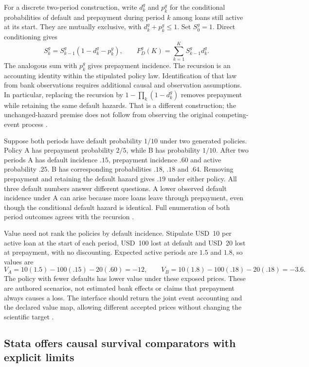 For a discrete two-period construction, write $d_k^g$ and $p_k^g$ for the
conditional probabilities of default and prepayment during period $k$ among
loans still active at its start. They are mutually exclusive, with
$d_k^g+p_k^g\leq1$. Set $S_0^g=1$. Direct conditioning gives
\[
 S_k^g=S_{k-1}^g(1-d_k^g-p_k^g),\qquad
 F_D^g(K)=\sum_{k=1}^K S_{k-1}^g d_k^g.
\]
The analogous sum with $p_k^g$ gives prepayment incidence. The recursion is
an accounting identity within the stipulated policy law. Identification of
that law from bank observations requires additional causal and observation
assumptions. In particular, replacing the recursion by
$1-\prod_k(1-d_k^g)$ removes prepayment while retaining the same default
hazards. That is a different construction; the unchanged-hazard premise
does not follow from observing the original competing-event process
\citep{exec14_survival_exact}.

Suppose both periods have default probability $1/10$ under two generated
policies. Policy A has prepayment probability $2/5$, while B has probability
$1/10$. After two periods A has default incidence $.15$, prepayment incidence
$.60$ and active probability $.25$. B has corresponding probabilities $.18$,
$.18$ and $.64$. Removing prepayment and retaining the default hazard gives
$.19$ under either policy. All three default numbers answer different
questions. A lower observed default incidence under A can arise because more
loans leave through prepayment, even though the conditional default hazard
is identical. Full enumeration of both period outcomes agrees with the
recursion \citep{exec14_survival_exact}.

Value need not rank the policies by default incidence. Stipulate USD~10 per
active loan at the start of each period, USD~100 lost at default and USD~20
lost at prepayment, with no discounting. Expected active periods are $1.5$
and $1.8$, so values are
\[
 V_A=10(1.5)-100(.15)-20(.60)=-12,\qquad
 V_B=10(1.8)-100(.18)-20(.18)=-3.6.
\]
The policy with fewer defaults has lower value under these exposed prices.
These are authored scenarios, not estimated bank effects or claims that
prepayment always causes a loss. The interface should return the joint event
accounting and the declared value map, allowing different accepted prices
without changing the scientific target \citep{exec14_survival_exact}.

\subsection{Stata offers causal survival comparators with explicit limits}

